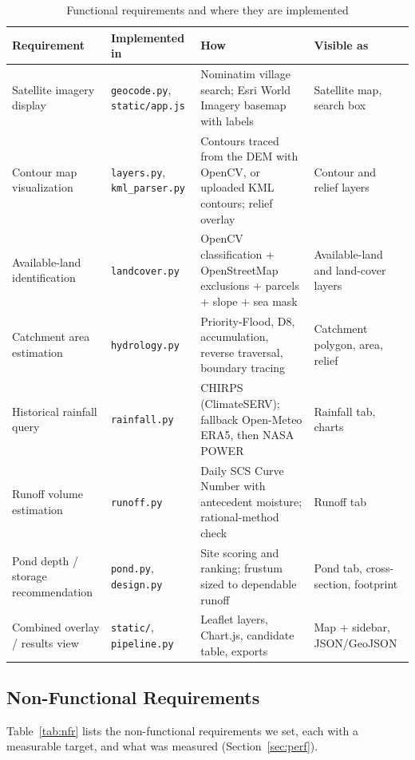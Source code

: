\documentclass[manuscript,screen,review]{acmart}
\newcommand{\code}[1]{\texttt{\small #1}}
\begin{document}
\begin{table}[h]
  \caption{Functional requirements and where they are implemented}
  \label{tab:requirements}
  \small
  \begin{tabularx}{\linewidth}{@{}P{3.3cm}P{3.4cm}YP{3.0cm}@{}}
    \toprule
    Requirement & Implemented in & How & Visible as \\
    \midrule
    Satellite imagery display & \code{geocode.py}, \code{static/app.js} & Nominatim village search; Esri World Imagery basemap with labels & Satellite map, search box \\
    Contour map visualization & \code{layers.py}, \code{kml\_parser.py} & Contours traced from the DEM with OpenCV, or uploaded KML contours; relief overlay & Contour and relief layers \\
    Available-land identification & \code{landcover.py} & OpenCV classification + OpenStreetMap exclusions + parcels + slope + sea mask & Available-land and land-cover layers \\
    Catchment area estimation & \code{hydrology.py} & Priority-Flood, D8, accumulation, reverse traversal, boundary tracing & Catchment polygon, area, relief \\
    Historical rainfall query & \code{rainfall.py} & CHIRPS (ClimateSERV); fallback Open-Meteo ERA5, then NASA POWER & Rainfall tab, charts \\
    Runoff volume estimation & \code{runoff.py} & Daily SCS Curve Number with antecedent moisture; rational-method check & Runoff tab \\
    Pond depth / storage recommendation & \code{pond.py}, \code{design.py} & Site scoring and ranking; frustum sized to dependable runoff & Pond tab, cross-section, footprint \\
    Combined overlay / results view & \code{static/}, \code{pipeline.py} & Leaflet layers, Chart.js, candidate table, exports & Map + sidebar, JSON/GeoJSON \\
    \bottomrule
  \end{tabularx}
\end{table}

\subsection{Non-Functional Requirements}
Table~\ref{tab:nfr} lists the non-functional requirements we set, each with a measurable
target, and what was measured (Section~\ref{sec:perf}).
\end{document}
